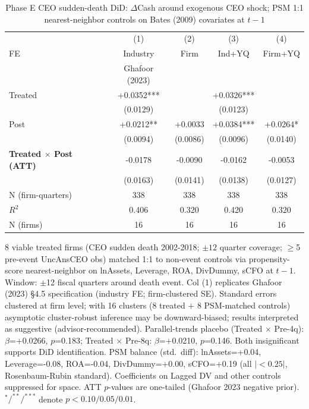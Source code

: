 \begin{table}[!htbp]
\centering\footnotesize
\caption{Phase E CEO sudden-death DiD: $\Delta$Cash around exogenous CEO shock; PSM 1:1 nearest-neighbor controls on Bates (2009) covariates at $t-1$}
\label{tab:ceo_death_did}
\begin{tabular}{lcccc}
\toprule
 & (1) & (2) & (3) & (4) \\
FE & Industry & Firm & Ind+YQ & Firm+YQ \\
 & Ghafoor (2023) &  &  &  \\
\midrule
Treated & +0.0352*** &  & +0.0326*** &  \\
 & (0.0129) &  & (0.0123) &  \\
Post & +0.0212** & +0.0033 & +0.0384*** & +0.0264* \\
 & (0.0094) & (0.0086) & (0.0096) & (0.0140) \\
\textbf{Treated $\times$ Post (ATT)} & -0.0178 & -0.0090 & -0.0162 & -0.0053 \\
 & (0.0163) & (0.0141) & (0.0138) & (0.0127) \\
\midrule
N (firm-quarters) & 338 & 338 & 338 & 338 \\
$R^2$ & 0.406 & 0.320 & 0.420 & 0.320 \\
N (firms) & 16 & 16 & 16 & 16 \\
\bottomrule
\end{tabular}
\begin{tablenotes}\footnotesize\item 8 viable treated firms (CEO sudden death 2002-2018; $\pm 12$ quarter coverage; $\geq$5 pre-event UncAnsCEO obs) matched 1:1 to non-event controls via propensity-score nearest-neighbor on lnAssets, Leverage, ROA, DivDummy, sCFO at $t-1$. Window: $\pm$12 fiscal quarters around death event. Col (1) replicates Ghafoor (2023) \S4.5 specification (industry FE; firm-clustered SE). Standard errors clustered at firm level; with 16 clusters (8 treated $+$ 8 PSM-matched controls) asymptotic cluster-robust inference may be downward-biased; results interpreted as suggestive (advisor-recommended). Parallel-trends placebo (Treated $\times$ Pre-4q): $\beta$=+0.0266, $p$=0.183; Treated $\times$ Pre-8q: $\beta$=+0.0210, $p$=0.146. Both insignificant supports DiD identification. PSM balance (std.\ diff): lnAssets=+0.04, Leverage=-0.08, ROA=-0.04, DivDummy=+0.00, sCFO=+0.19 (all $|<0.25|$, Rosenbaum-Rubin standard). Coefficients on Lagged DV and other controls suppressed for space. ATT $p$-values are one-tailed (Ghafoor 2023 negative prior). $^{*}/^{**}/^{***}$ denote $p<0.10/0.05/0.01$.\end{tablenotes}
\end{table}